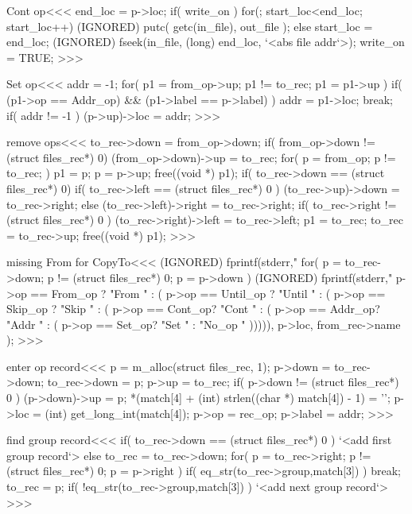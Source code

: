\<Cont op\><<<
end_loc = p->loc;
if( write_on ){
   for(; start_loc<end_loc; start_loc++) {
      (IGNORED) putc( getc(in_file), out_file );
   } 
} else { 
   start_loc = end_loc;
   (IGNORED) fseek(in_file, (long) end_loc, `<abs file addr`>); 
}
write_on = TRUE;
>>>


\<Set op\><<<
addr = -1;
for( p1 = from_op->up; p1 != to_rec;  p1 = p1->up ){  
  if( (p1->op == Addr_op) && (p1->label == p->label) ){
    addr = p1->loc; break;
} }
if( addr != -1 ){ (p->up)->loc = addr; }
>>>


\<remove ops\><<<
to_rec->down = from_op->down;
if( from_op->down != (struct files_rec*) 0){
    (from_op->down)->up = to_rec;
} 
for( p = from_op; p != to_rec; ){
  p1 = p;  p = p->up; free((void *)  p1);  
}
if( to_rec->down == (struct files_rec*) 0){
  if( to_rec->left == (struct files_rec*) 0 ){
    (to_rec->up)->down =  to_rec->right;
  } else {
    (to_rec->left)->right = to_rec->right;
  }
  if( to_rec->right != (struct files_rec*) 0 ){
    (to_rec->right)->left = to_rec->left;
  }
  p1 = to_rec; to_rec = to_rec->up;  free((void *)  p1);
}
>>>

\<missing From for CopyTo\><<<
(IGNORED) fprintf(stderr,"%
for( p = to_rec->down; p != (struct files_rec*) 0;  p = p->down ){
  (IGNORED) fprintf(stderr,"   %
          p->op == From_op ?  "From  " :
             ( p->op == Until_op ?   "Until " :
               ( p->op == Skip_op ?   "Skip  " :
                 ( p->op == Cont_op?   "Cont " :
                 ( p->op == Addr_op?   "Addr " :
                 ( p->op == Set_op?   "Set " : "No_op " ))))),
          p->loc, from_rec->name
         );
}
>>>




\<enter op record\><<<
p = m_alloc(struct files_rec, 1);
p->down = to_rec->down;  to_rec->down = p;
p->up = to_rec;
if( p->down != (struct files_rec*) 0 ){
  (p->down)->up = p;
}
*(match[4] + (int) strlen((char *) match[4]) - 1) = '\0';
p->loc = (int) get_long_int(match[4]);
p->op  = rec_op;
p->label = addr;
>>>

\<find group record\><<<
if( to_rec->down == (struct files_rec*) 0 ){
  `<add first group record`>
} else {
  to_rec = to_rec->down;
  for( p = to_rec->right; p != (struct files_rec*) 0;  p = p->right ){
    if( eq_str(to_rec->group,match[3]) ){ break; }
    to_rec = p;
  }
  if( !eq_str(to_rec->group,match[3]) ){ 
    `<add next group record`>
} }
>>>



